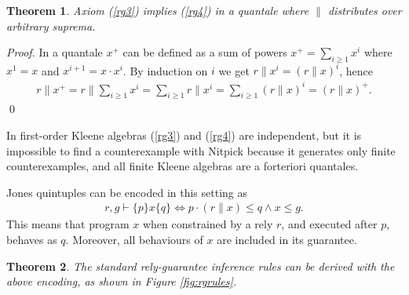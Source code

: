 \documentclass{llncs}
\newtheorem{thm}{Theorem}
\begin{document}
\begin{thm}
  Axiom (\ref{rg3}) implies (\ref{rg4}) in a quantale
  where $\|$ distributes over arbitrary suprema.
\end{thm}
\begin{proof}
  In a quantale $x^+$ can be defined as a sum of powers
  $x^+=\sum_{i\ge 1} x^i$ where $x^1=x$ and $x^{i+1}=x\cdot x^i$. By
  induction on $i$ we get $r\|x^i = (r\|x)^i$, hence
  \begin{align*}
    r\|x^+ = r\|\sum_{i\ge 1} x^i = \sum_{i\ge 1} r\|x^i = \sum_{i\ge 1} (r\|x)^i = (r\|x)^+.
  \end{align*}
  \qed
\end{proof}

In first-order Kleene algebras (\ref{rg3}) and (\ref{rg4}) are
independent, but it is impossible to find a counterexample with
Nitpick because it generates only finite counterexamples, and all
finite Kleene algebras are a forteriori quantales.

Jones quintuples can be encoded in this setting as
\begin{align}
r, g \vdash \{p\} x \{q\} \iff p\cdot(r\|x) \le q \land x \le g. \label{quin}
\end{align}
This means that program $x$ when constrained by a rely $r$, and
executed after $p$, behaves as $q$. Moreover, all behaviours of $x$
are included in its guarantee.

\begin{thm}
  The standard rely-guarantee inference rules can be derived with the
  above encoding, as shown in Figure \ref{fig:rgrules}.
\end{thm}
\end{document}
